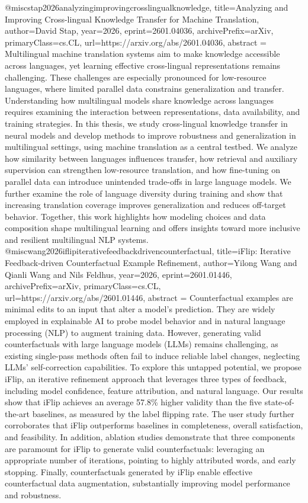 {}@misc{stap2026analyzingimprovingcrosslingualknowledge,
      title={Analyzing and Improving Cross-lingual Knowledge Transfer for Machine Translation}, 
      author={David Stap},
      year={2026},
      eprint={2601.04036},
      archivePrefix={arXiv},
      primaryClass={cs.CL},
      url={https://arxiv.org/abs/2601.04036},
      abstract = {Multilingual machine translation systems aim to make knowledge accessible across languages, yet learning effective cross-lingual representations remains challenging. These challenges are especially pronounced for low-resource languages, where limited parallel data constrains generalization and transfer. Understanding how multilingual models share knowledge across languages requires examining the interaction between representations, data availability, and training strategies. In this thesis, we study cross-lingual knowledge transfer in neural models and develop methods to improve robustness and generalization in multilingual settings, using machine translation as a central testbed. We analyze how similarity between languages influences transfer, how retrieval and auxiliary supervision can strengthen low-resource translation, and how fine-tuning on parallel data can introduce unintended trade-offs in large language models. We further examine the role of language diversity during training and show that increasing translation coverage improves generalization and reduces off-target behavior. Together, this work highlights how modeling choices and data composition shape multilingual learning and offers insights toward more inclusive and resilient multilingual NLP systems.}
}@misc{wang2026iflipiterativefeedbackdrivencounterfactual,
      title={iFlip: Iterative Feedback-driven Counterfactual Example Refinement}, 
      author={Yilong Wang and Qianli Wang and Nils Feldhus},
      year={2026},
      eprint={2601.01446},
      archivePrefix={arXiv},
      primaryClass={cs.CL},
      url={https://arxiv.org/abs/2601.01446},
      abstract = {Counterfactual examples are minimal edits to an input that alter a model's prediction. They are widely employed in explainable AI to probe model behavior and in natural language processing (NLP) to augment training data. However, generating valid counterfactuals with large language models (LLMs) remains challenging, as existing single-pass methods often fail to induce reliable label changes, neglecting LLMs' self-correction capabilities. To explore this untapped potential, we propose iFlip, an iterative refinement approach that leverages three types of feedback, including model confidence, feature attribution, and natural language. Our results show that iFlip achieves an average 57.8\% higher validity than the five state-of-the-art baselines, as measured by the label flipping rate. The user study further corroborates that iFlip outperforms baselines in completeness, overall satisfaction, and feasibility. In addition, ablation studies demonstrate that three components are paramount for iFlip to generate valid counterfactuals: leveraging an appropriate number of iterations, pointing to highly attributed words, and early stopping. Finally, counterfactuals generated by iFlip enable effective counterfactual data augmentation, substantially improving model performance and robustness.}
}
